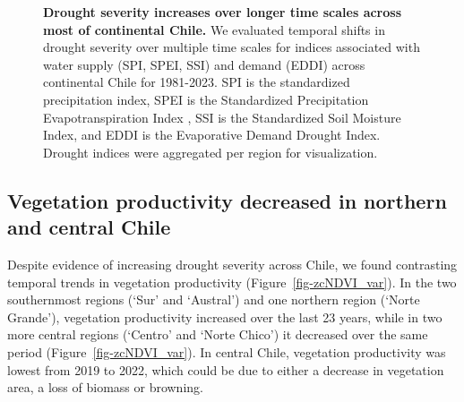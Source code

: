 \documentclass[
  sn-nature,
  numbered]{sn-jnl}
\begin{document}
\begin{figure}[!ht]


\caption{\label{fig-trendDIMacro}\textbf{Drought severity increases over
longer time scales across most of continental Chile.} We evaluated
temporal shifts in drought severity over multiple time scales for
indices associated with water supply (SPI, SPEI, SSI) and demand (EDDI)
across continental Chile for 1981-2023. SPI is the standardized
precipitation index, SPEI is the Standardized Precipitation
Evapotranspiration Index , SSI is the Standardized Soil Moisture Index,
and EDDI is the Evaporative Demand Drought Index. Drought indices were
aggregated per region for visualization.}

\end{figure}%

\subsection{Vegetation productivity decreased in northern and central
Chile}\label{vegetation-productivity-decreased-in-northern-and-central-chile}

Despite evidence of increasing drought severity across Chile, we found
contrasting temporal trends in vegetation productivity
(Figure~\ref{fig-zcNDVI_var}). In the two southernmost regions (`Sur'
and `Austral') and one northern region (`Norte Grande'), vegetation
productivity increased over the last 23 years, while in two more central
regions (`Centro' and `Norte Chico') it decreased over the same period
(Figure~\ref{fig-zcNDVI_var}). In central Chile, vegetation productivity
was lowest from 2019 to 2022, which could be due to either a decrease in
vegetation area, a loss of biomass or browning.
\end{document}
